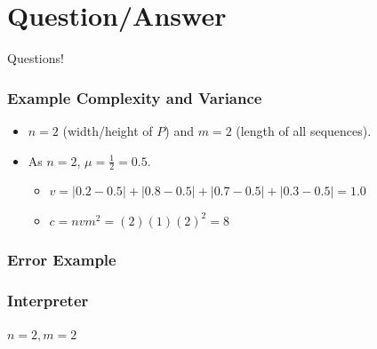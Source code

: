 \documentclass{beamer}
\begin{document}
\section{Question/Answer}
\begin{frame}
    Questions!
\end{frame}

\begin{frame}
    \frametitle{Example Complexity and Variance}
    
    \begin{itemize}
    \item $n=2$ (width/height of $P$) and $m=2$ (length of all sequences).
    \item As $n=2$, $\mu = \frac{1}{2} = 0.5$.
    \begin{itemize}
        \item $v = |0.2 - 0.5| + |0.8 - 0.5| + |0.7 - 0.5| + |0.3 - 0.5| = 1.0$
        \item $c = nvm^2 = (2)(1)(2)^2 = 8$
    \end{itemize}
    \end{itemize}
\end{frame}

\begin{frame}
\frametitle{Error Example}

\end{frame}

\begin{frame}
\frametitle{Interpreter}
$n=2, m=2$
\begin{center}

\end{center}
\end{frame}
\end{document}
